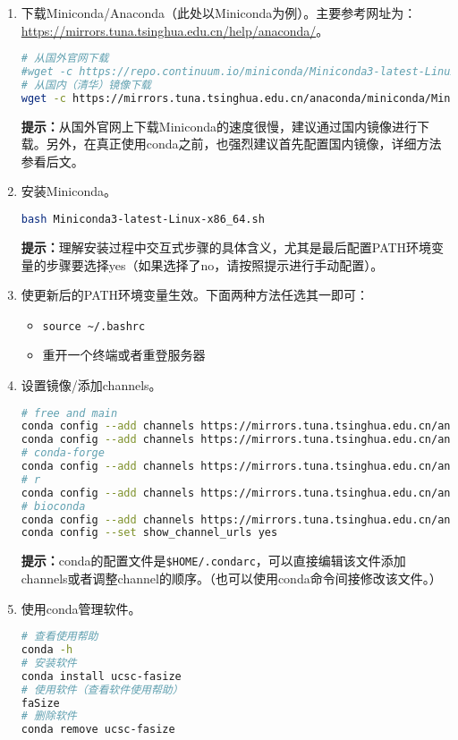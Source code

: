 \begin{enumerate}
  \item 下载Miniconda/Anaconda（此处以Miniconda为例）。主要参考网址为：\href{https://mirrors.tuna.tsinghua.edu.cn/help/anaconda/}{https://mirrors.tuna.tsinghua.edu.cn/help/anaconda/}。
\begin{lstlisting}[language=bash]
# 从国外官网下载
#wget -c https://repo.continuum.io/miniconda/Miniconda3-latest-Linux-x86_64.sh
# 从国内（清华）镜像下载
wget -c https://mirrors.tuna.tsinghua.edu.cn/anaconda/miniconda/Miniconda3-latest-Linux-x86_64.sh
\end{lstlisting}
\textbf{提示：}从国外官网上下载Miniconda的速度很慢，建议通过国内镜像进行下载。另外，在真正使用conda之前，也强烈建议首先配置国内镜像，详细方法参看后文。
  \item 安装Miniconda。
\begin{lstlisting}[language=bash]
bash Miniconda3-latest-Linux-x86_64.sh
\end{lstlisting}
\textbf{提示：}理解安装过程中交互式步骤的具体含义，尤其是最后配置PATH环境变量的步骤要选择yes（如果选择了no，请按照提示进行手动配置）。
  \item 使更新后的PATH环境变量生效。下面两种方法任选其一即可：
    \begin{itemize}
      \item \verb|source ~/.bashrc|
      \item 重开一个终端或者重登服务器
    \end{itemize}
  \item 设置镜像/添加channels。
\begin{lstlisting}[language=bash]
# free and main
conda config --add channels https://mirrors.tuna.tsinghua.edu.cn/anaconda/pkgs/free/
conda config --add channels https://mirrors.tuna.tsinghua.edu.cn/anaconda/pkgs/main/
# conda-forge
conda config --add channels https://mirrors.tuna.tsinghua.edu.cn/anaconda/cloud/conda-forge/
# r
conda config --add channels https://mirrors.tuna.tsinghua.edu.cn/anaconda/pkgs/r/
# bioconda
conda config --add channels https://mirrors.tuna.tsinghua.edu.cn/anaconda/cloud/bioconda/
conda config --set show_channel_urls yes
\end{lstlisting}
\textbf{提示：}conda的配置文件是\verb|$HOME/.condarc|，可以直接编辑该文件添加channels或者调整channel的顺序。（也可以使用conda命令间接修改该文件。）
  \item 使用conda管理软件。
\begin{lstlisting}[language=bash]
# 查看使用帮助
conda -h
# 安装软件
conda install ucsc-fasize
# 使用软件（查看软件使用帮助）
faSize
# 删除软件
conda remove ucsc-fasize
\end{lstlisting}
\end{enumerate}

